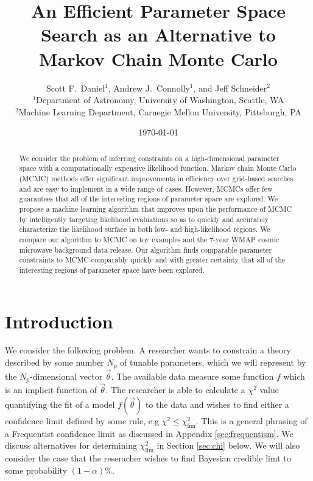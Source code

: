 \documentclass[useAMS,usenatbib]{aastex}
\title
{An Efficient Parameter Space Search as an Alternative to Markov Chain Monte Carlo}
\author
{Scott F.\ Daniel$^1$, Andrew J.\ Connolly$^1$, and Jeff Schneider$^2$\\
$^1$Department of Astronomy, University of Washington, Seattle, WA\\ 
$^2$Machine Learning Department, Carnegie Mellon University, Pittsburgh, PA
}
\begin{document}
 



\label{firstpage}

\date{\today}

\maketitle 

\begin{abstract} 
We consider the problem of inferring constraints on a high-dimensional parameter
space with a computationally expensive likelihood function.  
Markov chain Monte Carlo (MCMC) methods offer significant improvements in
efficiency over grid-based searches and are easy to implement in a wide range of
cases.  However, MCMCs offer 
few guarantees that all of the interesting regions of 
parameter space are explored.
We propose a
machine learning algorithm that improves upon the performance of MCMC
by intelligently targeting likelihood evaluations so as to quickly and
accurately characterize the likelihood surface in both low- and high-likelihood
regions.  
We compare our algorithm to MCMC on toy examples and the 7-year WMAP
cosmic microwave background data release.  
Our algorithm finds comparable parameter
constraints to MCMC comparably quickly and with greater
certainty that all of the interesting regions of parameter space have been
explored.
\end{abstract} 

\section{Introduction}
\label{sec:intro}

We consider the following problem.  A researcher wants to constrain a theory
described by some number $N_p$ of tunable parameters, which we will represent by
the $N_p$-dimensional vector $\vec{\theta}$.  The available data measure some
function $f$ which is an implicit function of $\vec{\theta}$.  The researcher
is able to calculate a $\chi^2$ value quantifying the fit of a 
model $f(\vec{\theta})$ to the data and wishes to find either a confidence limit
defined by some rule, e.g $\chi^2\le\chi^2_\text{lim}$.  This is a general
phrasing of a Frequentist confidence limit as discussed in Appendix
\ref{sec:frequentism}.  We discuss alternatives for determining
$\chi^2_\text{lim}$ in Section \ref{sec:chi} below.  We will also consider
the case that the reseracher wishes to find Bayesian credible limt
to some probability $(1-\alpha)\%$.
\end{document}
